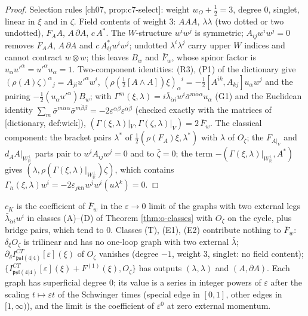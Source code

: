 \begin{proof}
Selection rules [ch07, prop:c7-select]: weight $w_O+\tfrac12=3$, degree $0$, singlet, linear in $\xi$ and in $\zeta$. Field contents of weight $3$: $AAA$, $\lambda\lambda$ (two dotted or two undotted), $F_AA$, $A\,\partial A$, $c\,A^*$. The $W$-structure $w^iw^j$ is symmetric; $A_{ij}w^iw^j=0$ removes $F_AA$, $A\,\partial A$ and $c\,A^*_{ij}w^iw^j$; undotted $\lambda^i\lambda^j$ carry upper $W$ indices and cannot contract $w\otimes w$; this leaves $B_w$ and $\bar F_w$, whose spinor factor is $u_\alpha u'^\alpha=u'^\alpha u_\alpha=1$. Two-component identities: (R3), (P1) of the dictionary give $(\rho(A)\zeta)^\alpha{}_j=A_{ji}u'^\alpha w^i$, $(\rho(\tfrac12[A\wedge A])\xi)_\alpha{}^i=-\tfrac12[A^{ik},A_{kj}]u_\alpha w^j$ and the pairing $-\tfrac12(u_\alpha u'^\alpha)B_w$; with $\Gamma^m(\xi,\lambda)=i\bar\lambda_{\dot\alpha i}w^i\bar\sigma^{m\dot\alpha\alpha}u_\alpha$ (G1) and the Euclidean identity $\sum_m\bar\sigma^{m\dot\alpha\alpha}\bar\sigma^{m\dot\beta\beta}=-2\varepsilon^{\alpha\beta}\varepsilon^{\dot\alpha\dot\beta}$ (checked exactly with the matrices of [dictionary, def:wick]), $(\Gamma(\xi,\lambda)|_V,\Gamma(\zeta,\lambda)|_V)=2\,\bar F_w$. The classical component: the bracket pairs $\lambda^*$ of $\tfrac12(\rho(F_A)\xi,\lambda^*)$ with $\lambda$ of $O_\zeta$; the $F_{A|_V}$ and $d_AA|_{W_{\mathbb R}^\perp}$ parts pair to $w^iA_{ij}w^j=0$ and to $\bar\zeta=0$; the term $-(\Gamma(\xi,\lambda)|_{W_{\mathbb R}^\perp},A^*)$ gives $(\lambda,\rho(\Gamma(\xi,\lambda)|_{W_{\mathbb R}^\perp})\zeta)$, which contains $\Gamma_{li}(\xi,\lambda)w^i=-2\varepsilon_{jkli}w^jw^i(u\lambda^k)=0$.
\end{proof}

\begin{proposition}[Graphs of $c_K$]
\label{prop:o-cKgraphs}
$c_K$ is the coefficient of $\bar F_w$ in the $\varepsilon\to0$ limit of the graphs with two external legs $\bar\lambda_{\dot\alpha i}w^i$ in classes (A)--(D) of Theorem \ref{thm:o-classes} with $O_\zeta$ on the cycle, plus bridge pairs, which tend to $0$. Classes (T), (E1), (E2) contribute nothing to $\bar F_w$: $\delta_\xi O_\zeta$ is trilinear and has no one-loop graph with two external $\bar\lambda$; $\partial_\delta I^{CT}_{\mathfrak{psl}(4|4)}[\varepsilon](\xi)$ of $O_\zeta$ vanishes (degree $-1$, weight $3$, singlet: no field content); $\{I^{CT}_{\mathfrak{psl}(4|4)}[\varepsilon](\xi)+F^{(1)}(\xi),O_\zeta\}$ has outputs $(\lambda,\lambda)$ and $(A,\partial A)$. Each graph has superficial degree $0$; its value is a series in integer powers of $\varepsilon$ after the scaling $t\mapsto\varepsilon t$ of the Schwinger times (special edge in $[0,1]$, other edges in $[1,\infty)$), and the limit is the coefficient of $\varepsilon^0$ at zero external momentum.
\end{proposition}

